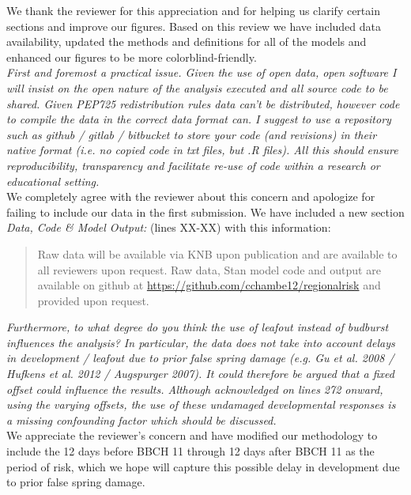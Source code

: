 \documentclass[11pt,a4paper]{article}\usepackage[]{graphicx}\usepackage[]{color}
\begin{document}
We thank the reviewer for this appreciation and for helping us clarify certain sections and improve our figures. Based on this review we have included data availability, updated the methods and definitions for all of the models and enhanced our figures to be more colorblind-friendly.  \\

\textit{First and foremost a practical issue. Given the use of open data, open software I will insist on the open nature of the analysis executed and all source code to be shared. Given PEP725 redistribution rules data can't be distributed, however code to compile the data in the correct data format can. I suggest to use a repository such as github / gitlab / bitbucket to store your code (and revisions) in their native format (i.e. no copied code in txt files, but .R files). All this should ensure reproducibility, transparency and facilitate re-use of code within a research or educational setting.} \\

We completely agree with the reviewer about this concern and apologize for failing to include our data in the first submission. We have included a new section \textit{Data, Code \& Model Output:} (lines XX-XX) with this information: \\

\begin{quotation}
\noindent  Raw data will be available via KNB upon publication and are available to all reviewers upon request. Raw data, {Stan} model code and output are available on github at \url{https://github.com/cchambe12/regionalrisk} and provided upon request.
\end{quotation}

\textit{Furthermore, to what degree do you think the use of leafout instead of budburst influences the analysis? In particular, the data does not take into account delays in development / leafout due to prior false spring damage (e.g. Gu et al. 2008 / Hufkens et al. 2012 / Augspurger 2007). It could therefore be argued that a fixed offset could influence the results. Although acknowledged on lines 272 onward, using the varying offsets, the use of these undamaged developmental responses is a missing confounding factor which should be discussed.} \\

We appreciate the reviewer's concern and have modified our methodology to include the 12 days before BBCH 11 through 12 days after BBCH 11 as the period of risk, which we hope will capture this possible delay in development due to prior false spring damage. \\
\end{document}
